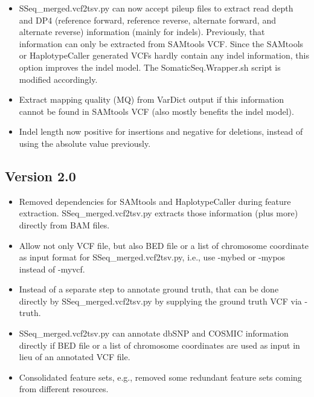 \documentclass[10pt,letterpaper]{article}
\begin{document}
\begin{sloppypar}
\begin{itemize}
 
  \item 
  SSeq\_merged.vcf2tsv.py can now accept pileup files to extract read depth and DP4 (reference forward, reference reverse, alternate forward, and alternate reverse) information (mainly for indels). Previously, that information can only be extracted from SAMtools VCF. Since the SAMtools or HaplotypeCaller generated VCFs hardly contain any indel information, this option improves the indel model. The SomaticSeq.Wrapper.sh script is modified accordingly.
 
  \item
  Extract mapping quality (MQ) from VarDict output if this information cannot be found in SAMtools VCF (also mostly benefits the indel model). 
 
  \item
  Indel length now positive for insertions and negative for deletions, instead of using the absolute value previously. 
 
 
\end{itemize}




\subsection{Version 2.0}

\begin{itemize}
  \item
  Removed dependencies for SAMtools and HaplotypeCaller during feature extraction. SSeq\_merged.vcf2tsv.py extracts those information (plus more) directly from BAM files.

  \item
  Allow not only VCF file, but also BED file or a list of chromosome coordinate as input format for SSeq\_merged.vcf2tsv.py, i.e., use -mybed or -mypos instead of -myvcf. 

  \item
  Instead of a separate step to annotate ground truth, that can be done directly by SSeq\_merged.vcf2tsv.py by supplying the ground truth VCF via -truth.

  \item
  SSeq\_merged.vcf2tsv.py can annotate dbSNP and COSMIC information directly if BED file or a list of chromosome coordinates are used as input in lieu of an annotated VCF file. 

  \item
  Consolidated feature sets, e.g., removed some redundant feature sets coming from different resources.
\end{itemize}



\end{sloppypar}
\end{document}

